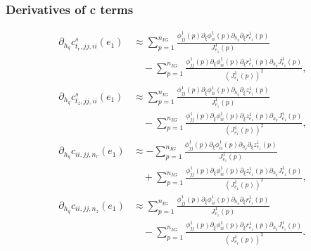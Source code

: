 \documentclass{article}
\begin{document}
\subsubsection{Derivatives of c terms}
\begin{align}
\partial_{h_q} c_{t_r,jj,ii}^{s}(e_1) &\approx \sum_{p=1}^{n_{IG}} \frac{ \phi_{jj}^1(p) \partial_\xi \phi_{ii}^1(p) \partial_{h_q} \partial_\xi r_{e_1}^1(p) }{ J_{e_1}^1(p) } \nonumber\\
&\quad - \sum_{p=1}^{n_{IG}} \frac{ \phi_{jj}^1(p) \partial_\xi \phi_{ii}^1(p) \partial_\xi r_{e_1}^1(p) \partial_{h_q} J_{e_1}^1(p) }{ (J_{e_1}^1(p))^2 }, \tag{21.101}\\
\partial_{h_q} c_{t_z,jj,ii}^{s}(e_1) &\approx \sum_{p=1}^{n_{IG}} \frac{ \phi_{jj}^1(p) \partial_\xi \phi_{ii}^1(p) \partial_{h_q} \partial_\xi z_{e_1}^1(p) }{ J_{e_1}^1(p) } \nonumber\\
&\quad - \sum_{p=1}^{n_{IG}} \frac{ \phi_{jj}^1(p) \partial_\xi \phi_{ii}^1(p) \partial_\xi z_{e_1}^1(p) \partial_{h_q} J_{e_1}^1(p) }{ (J_{e_1}^1(p))^2 }, \tag{21.104}\\
\partial_{h_q} c_{ii,jj,n_r}(e_1) &\approx -\sum_{p=1}^{n_{IG}} \frac{ \phi_{jj}^1(p) \partial_\xi \phi_{ii}^1(p) \partial_{h_q} \partial_\xi z_{e_1}^1(p) }{ J_{e_1}^1(p) } \nonumber\\
&\quad + \sum_{p=1}^{n_{IG}} \frac{ \phi_{jj}^1(p) \partial_\xi \phi_{ii}^1(p) \partial_\xi z_{e_1}^1(p) \partial_{h_q} J_{e_1}^1(p) }{ (J_{e_1}^1(p))^2 }, \tag{21.107}\\
\partial_{h_q} c_{ii,jj,n_z}(e_1) &\approx \sum_{p=1}^{n_{IG}} \frac{ \phi_{jj}^1(p) \partial_\xi \phi_{ii}^1(p) \partial_{h_q} \partial_\xi r_{e_1}^1(p) }{ J_{e_1}^1(p) } \nonumber\\
&\quad - \sum_{p=1}^{n_{IG}} \frac{ \phi_{jj}^1(p) \partial_\xi \phi_{ii}^1(p) \partial_\xi r_{e_1}^1(p) \partial_{h_q} J_{e_1}^1(p) }{ (J_{e_1}^1(p))^2 }. \tag{21.110}
\end{align}
\end{document}
